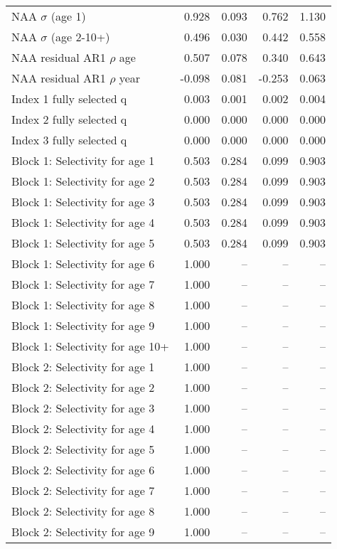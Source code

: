\documentclass[
]{article}
\begin{document}
\begin{landscape}
\begin{longtable}[t]{lrrrr}
\endfoot
\bottomrule
\endlastfoot
NAA $\sigma$ (age 1) & 0.928 & 0.093 & 0.762 & 1.130\\
NAA $\sigma$ (age 2-10+) & 0.496 & 0.030 & 0.442 & 0.558\\
NAA residual AR1 $\rho$ age & 0.507 & 0.078 & 0.340 & 0.643\\
NAA residual AR1 $\rho$ year & -0.098 & 0.081 & -0.253 & 0.063\\
Index 1 fully selected q & 0.003 & 0.001 & 0.002 & 0.004\\
\addlinespace
Index 2 fully selected q & 0.000 & 0.000 & 0.000 & 0.000\\
Index 3 fully selected q & 0.000 & 0.000 & 0.000 & 0.000\\
Block 1: Selectivity for age 1 & 0.503 & 0.284 & 0.099 & 0.903\\
Block 1: Selectivity for age 2 & 0.503 & 0.284 & 0.099 & 0.903\\
Block 1: Selectivity for age 3 & 0.503 & 0.284 & 0.099 & 0.903\\
\addlinespace
Block 1: Selectivity for age 4 & 0.503 & 0.284 & 0.099 & 0.903\\
Block 1: Selectivity for age 5 & 0.503 & 0.284 & 0.099 & 0.903\\
Block 1: Selectivity for age 6 & 1.000 & -- & -- & --\\
Block 1: Selectivity for age 7 & 1.000 & -- & -- & --\\
Block 1: Selectivity for age 8 & 1.000 & -- & -- & --\\
\addlinespace
Block 1: Selectivity for age 9 & 1.000 & -- & -- & --\\
Block 1: Selectivity for age 10+ & 1.000 & -- & -- & --\\
Block 2: Selectivity for age 1 & 1.000 & -- & -- & --\\
Block 2: Selectivity for age 2 & 1.000 & -- & -- & --\\
Block 2: Selectivity for age 3 & 1.000 & -- & -- & --\\
\addlinespace
Block 2: Selectivity for age 4 & 1.000 & -- & -- & --\\
Block 2: Selectivity for age 5 & 1.000 & -- & -- & --\\
Block 2: Selectivity for age 6 & 1.000 & -- & -- & --\\
Block 2: Selectivity for age 7 & 1.000 & -- & -- & --\\
Block 2: Selectivity for age 8 & 1.000 & -- & -- & --\\
\addlinespace
Block 2: Selectivity for age 9 & 1.000 & -- & -- & --\\

\end{longtable}
\end{landscape}
\end{document}
